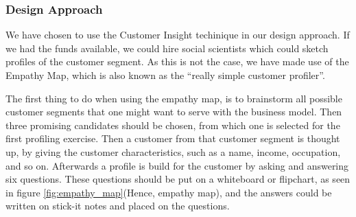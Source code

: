 \subsubsection{Design Approach}
We have chosen to use the Customer Insight\cite{1} techinique in our design approach. If we had the funds available, we could hire social scientists which could sketch profiles of the customer segment. As this is not the case, we have made use of the Empathy Map, which is also known as the ``really simple customer profiler''\cite{2}.

The first thing to do when using the empathy map, is to brainstorm all possible customer segments that one might want to serve with the business model. Then three promising candidates should be chosen, from which one is selected for the first profiling exercise. Then a customer from that customer segment is thought up, by giving the customer characteristics, such as a name, income, occupation, and so on. Afterwards a profile is build for the customer by asking and answering six questions.
These questions should be put on a whiteboard or flipchart, as seen in figure \ref{fig:empathy_map}(Hence, empathy map), and the answers could be written on stick-it notes and placed on the questions.

